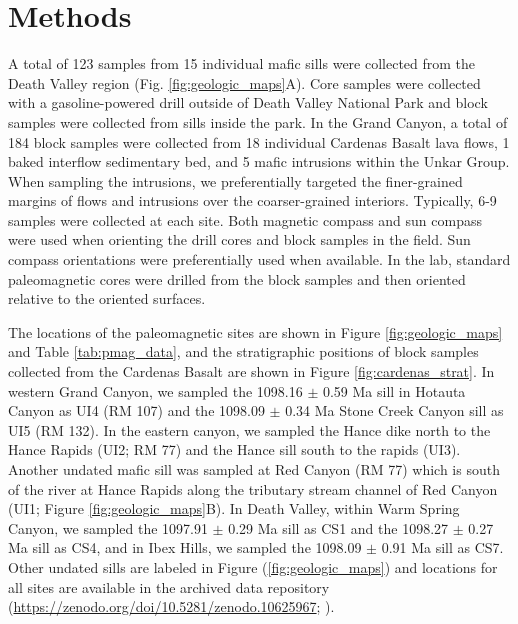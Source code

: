 \documentclass[draft]{agujournal2019}
\begin{document}
\section*{Methods}

A total of 123 samples from 15 individual mafic sills were collected from the Death Valley region (Fig. \ref{fig:geologic_maps}A). Core samples were collected with a gasoline-powered drill outside of Death Valley National Park and block samples were collected from sills inside the park. In the Grand Canyon, a total of 184 block samples were collected from 18 individual Cardenas Basalt lava flows, 1 baked interflow sedimentary bed, and 5 mafic intrusions within the Unkar Group. When sampling the intrusions, we preferentially targeted the finer-grained margins of flows and intrusions over the coarser-grained interiors. Typically, 6-9 samples were collected at each site. Both magnetic compass and sun compass were used when orienting the drill cores and block samples in the field. Sun compass orientations were preferentially used when available. In the lab, standard paleomagnetic cores were drilled from the block samples and then oriented relative to the oriented surfaces.

The locations of the paleomagnetic sites are shown in Figure \ref{fig:geologic_maps} and Table \ref{tab:pmag_data}, and the stratigraphic positions of block samples collected from the Cardenas Basalt are shown in Figure \ref{fig:cardenas_strat}. In western Grand Canyon, we sampled the 1098.16 $\pm$ 0.59 Ma sill in Hotauta Canyon as UI4 (RM 107) and the 1098.09 $\pm$ 0.34 Ma Stone Creek Canyon sill as UI5 (RM 132). In the eastern canyon, we sampled the Hance dike north to the Hance Rapids (UI2; RM 77) and the Hance sill south to the rapids (UI3). Another undated mafic sill was sampled at Red Canyon (RM 77) which is south of the river at Hance Rapids along the tributary stream channel of Red Canyon (UI1; Figure \ref{fig:geologic_maps}B). In Death Valley, within Warm Spring Canyon, we sampled the 1097.91 $\pm$ 0.29 Ma sill as CS1 and the 1098.27 $\pm$ 0.27 Ma sill as CS4, and in Ibex Hills, we sampled the 1098.09 $\pm$ 0.91 Ma sill as CS7. Other undated sills are labeled in Figure (\ref{fig:geologic_maps}) and locations for all sites are available in the archived data repository (\url{https://zenodo.org/doi/10.5281/zenodo.10625967}; ). 
\end{document}
